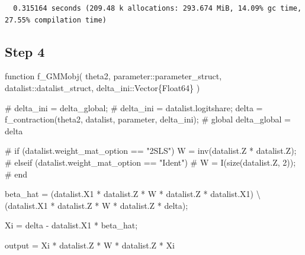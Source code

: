 \documentclass[
  letterpaper,
  DIV=11,
  numbers=noendperiod]{scrreprt}
\newenvironment{Shaded}{\begin{snugshade}}{\end{snugshade}}
\newcommand{\CommentTok}[1]{\textcolor[rgb]{0.37,0.37,0.37}{#1}}
\newcommand{\DataTypeTok}[1]{\textcolor[rgb]{0.68,0.00,0.00}{#1}}
\newcommand{\FunctionTok}[1]{\textcolor[rgb]{0.28,0.35,0.67}{#1}}
\newcommand{\KeywordTok}[1]{\textcolor[rgb]{0.00,0.23,0.31}{#1}}
\newcommand{\NormalTok}[1]{\textcolor[rgb]{0.00,0.23,0.31}{#1}}
\newcommand{\OperatorTok}[1]{\textcolor[rgb]{0.37,0.37,0.37}{#1}}
\begin{document}
\begin{verbatim}
  0.315164 seconds (209.48 k allocations: 293.674 MiB, 14.09% gc time, 27.55% compilation time)
\end{verbatim}

\hypertarget{step-4}{%
\subsection{Step 4}\label{step-4}}

\begin{Shaded}
\begin{Highlighting}[]
\KeywordTok{function} \FunctionTok{f\_GMMobj}\NormalTok{(}
\NormalTok{        theta2,}
\NormalTok{        parameter}\OperatorTok{::}\DataTypeTok{parameter\_struct}\NormalTok{,}
\NormalTok{        datalist}\OperatorTok{::}\DataTypeTok{datalist\_struct}\NormalTok{,}
\NormalTok{        delta\_ini}\OperatorTok{::}\DataTypeTok{Vector\{Float64\}}
\NormalTok{    )}
    
\CommentTok{\#     delta\_ini = delta\_global;}
\CommentTok{\#     delta\_ini = datalist.logitshare;}
\NormalTok{    delta }\OperatorTok{=} \FunctionTok{f\_contraction}\NormalTok{(theta2, datalist, parameter, delta\_ini);}
\CommentTok{\#     global delta\_global = delta}
    
\CommentTok{\#     if (datalist.weight\_mat\_option == "2SLS") }
\NormalTok{        W }\OperatorTok{=} \FunctionTok{inv}\NormalTok{(datalist.Z}\OperatorTok{\textquotesingle{}} \OperatorTok{*}\NormalTok{ datalist.Z);}
\CommentTok{\#     elseif (datalist.weight\_mat\_option == "Ident")}
\CommentTok{\#         W = I(size(datalist.Z, 2));}
\CommentTok{\#     end}
    
\NormalTok{    beta\_hat }\OperatorTok{=}\NormalTok{ (datalist.X1}\OperatorTok{\textquotesingle{}} \OperatorTok{*}\NormalTok{ datalist.Z }\OperatorTok{*}\NormalTok{ W }\OperatorTok{*}\NormalTok{ datalist.Z}\OperatorTok{\textquotesingle{}} \OperatorTok{*}\NormalTok{ datalist.X1) }\OperatorTok{\textbackslash{}}\NormalTok{ (datalist.X1}\OperatorTok{\textquotesingle{}} \OperatorTok{*}\NormalTok{ datalist.Z }\OperatorTok{*}\NormalTok{ W }\OperatorTok{*}\NormalTok{ datalist.Z}\OperatorTok{\textquotesingle{}} \OperatorTok{*}\NormalTok{ delta);}
    
\NormalTok{    Xi }\OperatorTok{=}\NormalTok{ delta }\OperatorTok{{-}}\NormalTok{ datalist.X1 }\OperatorTok{*}\NormalTok{ beta\_hat;}
    
\NormalTok{    output }\OperatorTok{=}\NormalTok{ Xi}\OperatorTok{\textquotesingle{}} \OperatorTok{*}\NormalTok{ datalist.Z }\OperatorTok{*}\NormalTok{ W }\OperatorTok{*}\NormalTok{ datalist.Z}\OperatorTok{\textquotesingle{}} \OperatorTok{*}\NormalTok{ Xi}
        

\end{Highlighting}
\end{Shaded}
\end{document}
